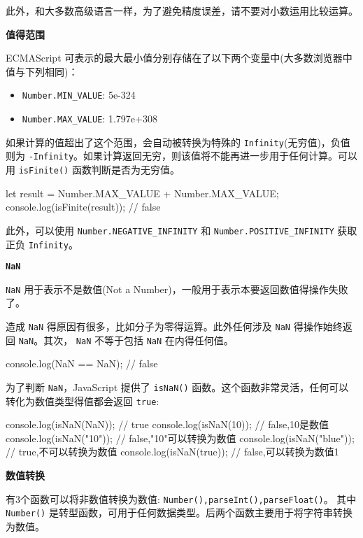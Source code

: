 此外，和大多数高级语言一样，为了避免精度误差，请不要对小数运用比较运算。

\noindent\textbf{值得范围}

ECMAScript 可表示的最大最小值分别存储在了以下两个变量中(大多数浏览器中值与下列相同)：

\begin{itemize}
    \item \texttt{Number.MIN\_VALUE}: 5e-324
    \item \texttt{Number.MAX\_VALUE}: 1.797e+308
\end{itemize}

如果计算的值超出了这个范围，会自动被转换为特殊的 \texttt{Infinity}(无穷值)，负值则为 \texttt{-Infinity}。如果计算返回无穷，则该值将不能再进一步用于任何计算。可以用 \texttt{isFinite()} 函数判断是否为无穷值。

\begin{JavaScript}
let result = Number.MAX_VALUE + Number.MAX_VALUE;
console.log(isFinite(result));      // false
\end{JavaScript}

此外，可以使用 \texttt{Number.NEGATIVE\_INFINITY} 和 \texttt{Number.POSITIVE\_INFINITY} 获取正负 \texttt{Infinity}。

\noindent\textbf{\texttt{NaN}}

\texttt{NaN} 用于表示不是数值(Not a Number)，一般用于表示本要返回数值得操作失败了。

造成 \texttt{NaN} 得原因有很多，比如分子为零得运算。此外任何涉及 \texttt{NaN} 得操作始终返回 \texttt{NaN}。其次， \texttt{NaN} 不等于包括 \texttt{NaN} 在内得任何值。

\begin{JavaScript}
console.log(NaN == NaN);    // false
\end{JavaScript}

为了判断 \texttt{NaN}，JavaScript 提供了 \texttt{isNaN()} 函数。这个函数非常灵活，任何可以转化为数值类型得值都会返回 \texttt{true}:

\begin{JavaScript}
console.log(isNaN(NaN));        // true
console.log(isNaN(10));         // false,10是数值
console.log(isNaN("10"));       // false,"10"可以转换为数值
console.log(isNaN("blue"));     // true,不可以转换为数值
console.log(isNaN(true));       // false,可以转换为数值1
\end{JavaScript}

\noindent\textbf{数值转换}

有3个函数可以将非数值转换为数值: \texttt{Number(),parseInt(),parseFloat()}。 其中 \texttt{Number()} 是转型函数，可用于任何数据类型。后两个函数主要用于将字符串转换为数值。

